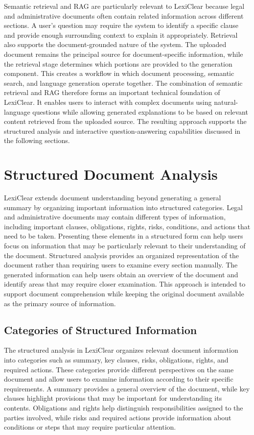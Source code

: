 \documentclass[12pt,a4paper,oneside]{report}
\begin{document}
Semantic retrieval and RAG are particularly relevant to LexiClear because
legal and administrative documents often contain related information across
different sections. A user's question may require the system to identify a
specific clause and provide enough surrounding context to explain it
appropriately. Retrieval also supports the document-grounded nature of the system. The
uploaded document remains the principal source for document-specific
information, while the retrieval stage determines which portions are
provided to the generation component. This creates a workflow in which
document processing, semantic search, and language generation operate
together. The combination of semantic retrieval and RAG therefore forms an important
technical foundation of LexiClear. It enables users to interact with complex
documents using natural-language questions while allowing generated
explanations to be based on relevant content retrieved from the uploaded
source. The resulting approach supports the structured analysis and
interactive question-answering capabilities discussed in the following
sections.
\section{Structured Document Analysis}

LexiClear extends document understanding beyond generating a general summary
by organizing important information into structured categories. Legal and
administrative documents may contain different types of information, including
important clauses, obligations, rights, risks, conditions, and actions that
need to be taken. Presenting these elements in a structured form can help
users focus on information that may be particularly relevant to their
understanding of the document. Structured analysis provides an organized representation of the document
rather than requiring users to examine every section manually. The generated
information can help users obtain an overview of the document and identify
areas that may require closer examination. This approach is intended to
support document comprehension while keeping the original document available
as the primary source of information.

\subsection{Categories of Structured Information}

The structured analysis in LexiClear organizes relevant document information
into categories such as summary, key clauses, risks, obligations, rights, and
required actions. These categories provide different perspectives on the
same document and allow users to examine information according to their
specific requirements. A summary provides a general overview of the document, while key clauses
highlight provisions that may be important for understanding its contents.
Obligations and rights help distinguish responsibilities assigned to the
parties involved, while risks and required actions provide information about
conditions or steps that may require particular attention.
\end{document}
